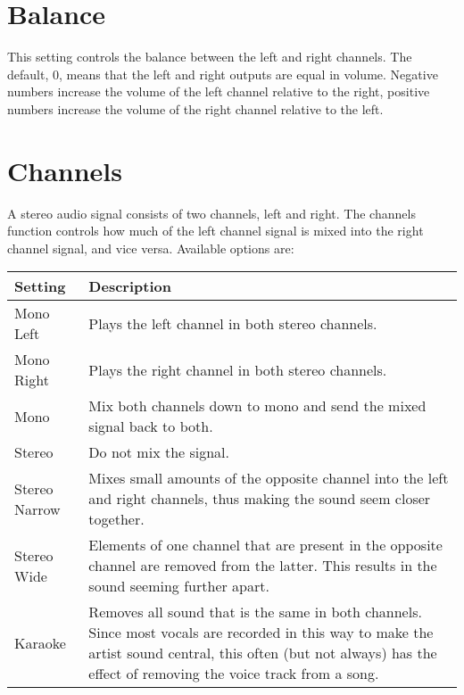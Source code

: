 \section{Balance}
  This setting controls the balance between the left and right channels.  The 
  default, 0, means that the left and right outputs are equal in volume.  
  Negative numbers increase the volume of the left channel relative to the
  right, positive numbers increase the volume of the right channel relative
  to the left.

\section{Channels}
  A stereo audio signal consists of two channels, left and right. The channels
   function controls how much of the left channel signal is mixed into the
   right channel signal, and vice versa.
  Available options are:
  \begin{table}
  \begin{center}
  \begin{tabularx}{\textwidth}{lX}\toprule
      \textbf{Setting} & \textbf{Description} \\\midrule
        Mono Left
        & Plays the left channel in both stereo channels. \\
        Mono Right
        & Plays the right channel in both stereo channels. \\
        Mono 
        & Mix both channels down to mono and send the mixed signal back to both. \\
        Stereo
        & Do not mix the signal. \\
        Stereo Narrow
        & Mixes small amounts of the opposite channel into the left and right
          channels, thus making the sound seem closer together. \\
        Stereo Wide 
        & Elements of one channel that are present in the opposite channel
          are removed from the latter.  This results in the sound seeming
          further apart. \\
        Karaoke
        & Removes all sound that is the same in both channels. Since most
          vocals are recorded in this way to make the artist sound central,
          this often (but not always) has the effect of removing the voice
          track from a song. \\
        \bottomrule
  \end{tabularx}
  \end{center}
  \end{table}
      
